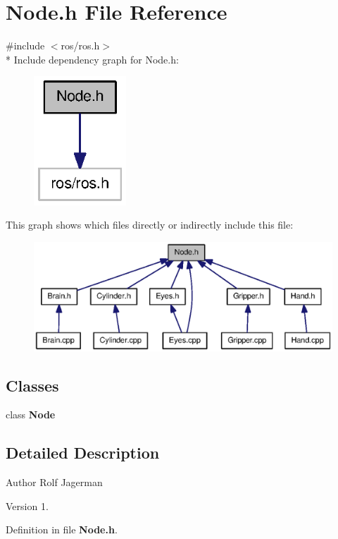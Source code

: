 \section{Node.\-h File Reference}
\label{Node_8h}
{\ttfamily \#include $<$ros/ros.\-h$>$}\\*
Include dependency graph for Node.\-h\-:\nopagebreak
\begin{figure}[H]
\begin{center}
\leavevmode
\includegraphics[width=98pt]{Node_8h__incl}
\end{center}
\end{figure}
This graph shows which files directly or indirectly include this file\-:\nopagebreak
\begin{figure}[H]
\begin{center}
\leavevmode
\includegraphics[width=350pt]{Node_8h__dep__incl}
\end{center}
\end{figure}
\subsection*{Classes}
\begin{DoxyCompactItemize}
\item 
class {\bf Node}
\end{DoxyCompactItemize}


\subsection{Detailed Description}
\begin{DoxyAuthor}{Author}
Rolf Jagerman 
\end{DoxyAuthor}
\begin{DoxyVersion}{Version}
1. 
\end{DoxyVersion}


Definition in file {\bf Node.\-h}.

